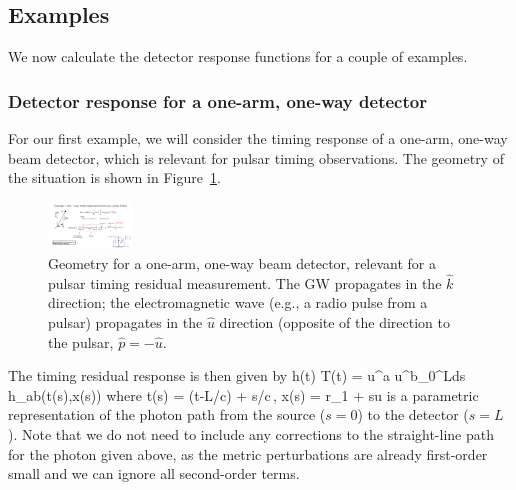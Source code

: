 \subsection{Examples}

We now calculate the detector response functions for a couple of
examples.

\subsubsection{Detector response for a one-arm, one-way detector}

For our first example, we will consider the timing response of a one-arm,
one-way beam detector, which is relevant for pulsar timing observations.
The geometry of the situation is shown in Figure~\ref{f:one_arm_one_way}.
%
\begin{figure}[htbp!]
\begin{center}
\includegraphics[width=0.2\textwidth]{Figures/one_arm_one_way}
\caption{Geometry for a one-arm, one-way beam detector, relevant for 
a pulsar timing residual measurement.
The GW propagates in the $\hat k$ direction; the electromagnetic wave
(e.g., a radio pulse from a pulsar) propagates in the $\hat u$ direction
(opposite of the direction to the pulsar, $\hat p=-\hat u$.} 
\label{f:one_arm_one_way}
\end{center}
\end{figure}
%
The timing residual response is then given by
\be
h(t)\equiv
\Delta T(t) =  u^a u^b\int_0^L{\rm d}s\> h_{ab}(t(s),\vec x(s))
\ee
%
where
%
\be
t(s) = (t-L/c) + s/c\,, \qquad
\vec x(s) = \vec r_1 + s\hat u
\ee
%
is a parametric representation of the photon path from the 
source ($s=0$) to the detector ($s=L$).
Note that we do not need to include any corrections to
the straight-line path for the photon given above, as the 
metric perturbations are already first-order small and we 
can ignore all second-order terms.

